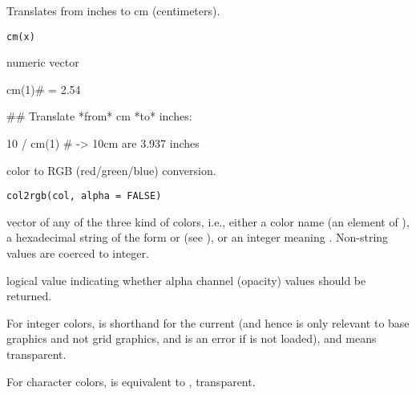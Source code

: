 %
\begin{Description}\relax
Translates from inches to cm (centimeters).
\end{Description}
%
\begin{Usage}
\begin{verbatim}
cm(x)
\end{verbatim}
\end{Usage}
%
\begin{Arguments}
\begin{ldescription}
\item[\code{x}] numeric vector
\end{ldescription}
\end{Arguments}
%
\begin{Examples}
\begin{ExampleCode}
cm(1)# = 2.54

## Translate *from* cm *to* inches:

10 / cm(1) # -> 10cm  are 3.937 inches
\end{ExampleCode}
\end{Examples}
%
\begin{Description}\relax
\R{} color to RGB (red/green/blue) conversion.
\end{Description}
%
\begin{Usage}
\begin{verbatim}
col2rgb(col, alpha = FALSE)
\end{verbatim}
\end{Usage}
%
\begin{Arguments}
\begin{ldescription}
\item[\code{col}] vector of any of the three kind of \R{} colors, i.e., either
a color name (an element of ), a hexadecimal
string of the form  or  (see
), or an integer  meaning
.  Non-string values are coerced to integer.
\item[\code{alpha}] logical value indicating whether alpha channel (opacity)
values should be returned.
\end{ldescription}
\end{Arguments}
%
\begin{Details}\relax
For integer colors,  is shorthand for the current
 (and hence is only relevant to base graphics
and not grid graphics, and is an error if  is not
loaded), and  means transparent.

For character colors,  is equivalent to , transparent.
\end{Details}
